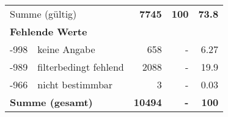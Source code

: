 \begin{longtable}{lXrrr}
     \midrule
     \multicolumn{2}{l}{Summe (gültig)} &
       \textbf{\num{7745}} &
     \textbf{\num{100}} &
       \textbf{\num[round-mode=places,round-precision=2]{73.8}} \\
     \multicolumn{5}{l}{\textbf{Fehlende Werte}}\\
       -998 &
       keine Angabe &
         \num{658} &
        - &
         \num[round-mode=places,round-precision=2]{6.27} \\
       -989 &
       filterbedingt fehlend &
         \num{2088} &
        - &
         \num[round-mode=places,round-precision=2]{19.9} \\
       -966 &
       nicht bestimmbar &
         \num{3} &
        - &
         \num[round-mode=places,round-precision=2]{0.03} \\
     \midrule
     \multicolumn{2}{l}{\textbf{Summe (gesamt)}} &
          \textbf{\num{10494}} &
        \textbf{-} &
        \textbf{\num{100}} \\
     \bottomrule
     \end{longtable}
     
